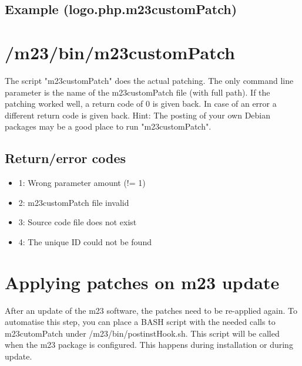 \subsection{Example (logo.php.m23customPatch)}





\section{/m23/bin/m23customPatch}
The script "m23customPatch" does the actual patching. The only command line parameter is the name of the m23customPatch file (with full path). If the patching worked well, a return code of 0 is given back. In case of an error a different return code is given back. Hint: The posting of your own Debian packages may be a good place to run "m23customPatch".

\subsection{Return/error codes}

\begin{itemize}
	\item 1: Wrong parameter amount (!= 1)
	\item 2: m23customPatch file invalid
	\item 3: Source code file does not exist
	\item 4: The unique ID could not be found
\end{itemize}





\section{Applying patches on m23 update}
After an update of the m23 software, the patches need to be re-applied again. To automatise this step, you can place a BASH script with the needed calls to m23cutomPatch under /m23/bin/postinstHook.sh. This script will be called when the m23 package is configured. This happens during installation or during update.